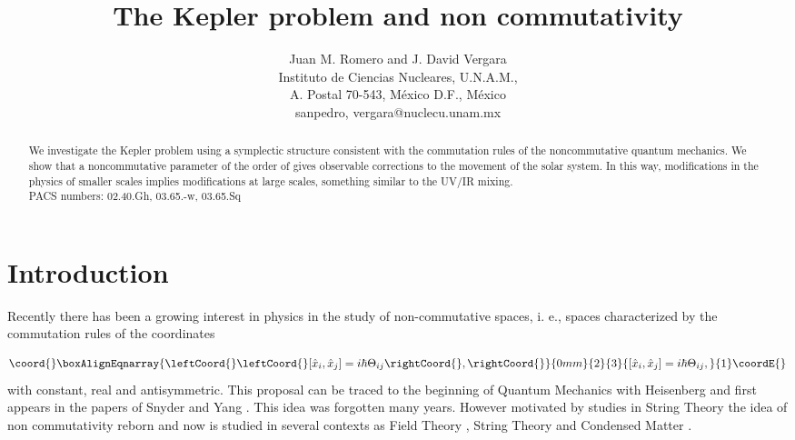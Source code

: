\documentclass[a4paper,12pt]{article}
\title{The Kepler problem and non commutativity \\}
\begin{document}
\pagestyle{plain}

\author{Juan M. Romero and J. David Vergara \\
Instituto de Ciencias Nucleares, U.N.A.M.,\\ A. Postal 70-543,
M\'exico D.F., M\'exico \\
sanpedro, vergara@nuclecu.unam.mx }



\maketitle

\begin{abstract}
We investigate the Kepler problem using a  symplectic structure
consistent with the commutation rules of the noncommutative
quantum mechanics. We show that a noncommutative parameter of the
order of \coordHE{} gives observable corrections to the
movement of the solar system. In this way, modifications in the
physics of smaller scales implies modifications at large scales,
something similar to the UV/IR mixing.
\\
PACS numbers: 02.40.Gh, 03.65.-w, 03.65.Sq
\end{abstract}




\section{Introduction}
Recently there has been a growing interest in physics in the study
of non-commutative spaces, i. e., spaces characterized by the
commutation rules of the coordinates

\begin{eqnarray}\coord{}\boxAlignEqnarray{\leftCoord{}
\leftCoord{}[\hat x_{i},\hat x_{j}]=i\hbar \Theta_{ij} \rightCoord{}\label{eq:conmutador},
\rightCoord{}}{0mm}{2}{3}{
[\hat x_{i},\hat x_{j}]=i\hbar \Theta_{ij} ,
}{1}\coordE{}\end{eqnarray}
with \coordHE{} constant, real and antisymmetric.
 This proposal can be traced to the beginning of Quantum Mechanics
 with  Heisenberg \cite{polchinski:gnus} and first appears in the
 papers of Snyder and Yang \cite{snyyang:gnus}. This idea
 was forgotten  many years. However motivated by studies in String Theory
the idea of non commutativity reborn and now is studied in several
contexts as Field Theory \cite{szabo:gnus}, String Theory
\cite{witten:gnus} and Condensed Matter \cite{ezawa:gnus}.
\end{document}
